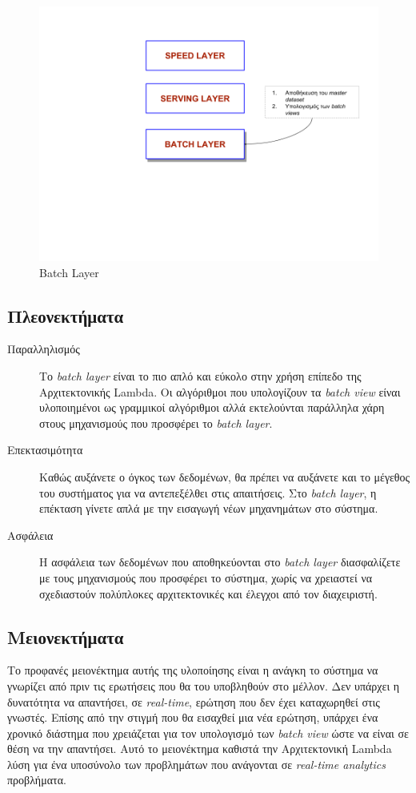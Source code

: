 \begin{figure}[t]
\caption{Batch Layer}
\includegraphics[width=14cm]{images/batch_layer.png}
\centering
\end{figure}
\clearpage

\subsection{Πλεονεκτήματα}
\begin{description}
\item[Παραλληλισμός] Το \textit{batch layer} είναι το πιο απλό και εύκολο στην χρήση επίπεδο της Αρχιτεκτονικής Lambda. Οι αλγόριθμοι που υπολογίζουν τα \textit{batch view} είναι υλοποιημένοι ως γραμμικοί αλγόριθμοι αλλά εκτελούνται παράλληλα χάρη στους μηχανισμούς που προσφέρει το \textit{batch layer}.
\item[Επεκτασιμότητα] Καθώς αυξάνετε ο όγκος των δεδομένων, θα πρέπει να αυξάνετε και το μέγεθος του συστήματος για να αντεπεξέλθει στις απαιτήσεις. Στο \textit{batch layer}, η επέκταση γίνετε απλά με την εισαγωγή νέων μηχανημάτων στο σύστημα.
\item[Ασφάλεια] Η ασφάλεια των δεδομένων που αποθηκεύονται στο \textit{batch layer} διασφαλίζετε με τους μηχανισμούς που προσφέρει το σύστημα, χωρίς να χρειαστεί να σχεδιαστούν πολύπλοκες αρχιτεκτονικές και έλεγχοι από τον διαχειριστή.
\end{description}


\subsection{Μειονεκτήματα}
Το προφανές μειονέκτημα αυτής της υλοποίησης είναι η ανάγκη το σύστημα να γνωρίζει από πριν τις ερωτήσεις που θα του υποβληθούν στο μέλλον. Δεν υπάρχει η δυνατότητα να απαντήσει, σε \textit{real-time}, ερώτηση που δεν έχει καταχωρηθεί στις γνωστές. Επίσης από την στιγμή που θα εισαχθεί μια νέα ερώτηση, υπάρχει ένα χρονικό διάστημα που χρειάζεται για τον υπολογισμό των \textit{batch view} ώστε να είναι σε θέση να την απαντήσει. Αυτό το μειονέκτημα καθιστά την Αρχιτεκτονική Lambda λύση για ένα υποσύνολο των προβλημάτων που ανάγονται σε \textit{real-time analytics} προβλήματα.

